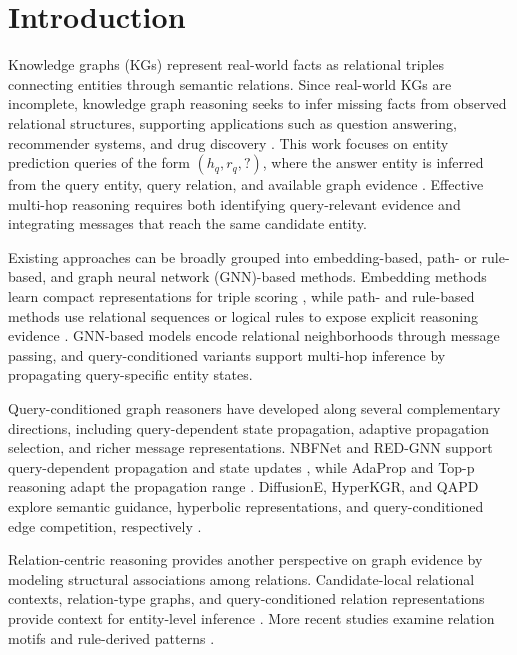\documentclass[a4paper,fleqn]{cas-dc}
\begin{document}
\maketitle

\section{Introduction}\label{sec:introduction}

Knowledge graphs (KGs) represent real-world facts as relational triples connecting entities through semantic relations. Since real-world KGs are incomplete, knowledge graph reasoning seeks to infer missing facts from observed relational structures, supporting applications such as question answering, recommender systems, and drug discovery \citep{Ji2022Survey,Cao2019KGRec,Zeng2022DrugDiscovery}. This work focuses on entity prediction queries of the form $(h_q,r_q,?)$, where the answer entity is inferred from the query entity, query relation, and available graph evidence \citep{QueryPerspectiveSurvey2025}. Effective multi-hop reasoning requires both identifying query-relevant evidence and integrating messages that reach the same candidate entity.

Existing approaches can be broadly grouped into embedding-based, path- or rule-based, and graph neural network (GNN)-based methods. Embedding methods learn compact representations for triple scoring \citep{Bordes2013TransE,Trouillon2016ComplEx,Sun2019RotatE}, while path- and rule-based methods use relational sequences or logical rules to expose explicit reasoning evidence \citep{Xiong2017DeepPath,Sadeghian2019DRUM}. GNN-based models encode relational neighborhoods through message passing, and query-conditioned variants support multi-hop inference by propagating query-specific entity states.

Query-conditioned graph reasoners have developed along several complementary directions, including query-dependent state propagation, adaptive propagation selection, and richer message representations. NBFNet and RED-GNN support query-dependent propagation and state updates \citep{Zhu2021NBFNet,Zhang2022REDGNN}, while AdaProp and Top-p reasoning adapt the propagation range \citep{Zhang2023AdaProp,Liu2025TopPReasoning}. DiffusionE, HyperKGR, and QAPD explore semantic guidance, hyperbolic representations, and query-conditioned edge competition, respectively \citep{Cao2024DiffusionE,HyperKGR2025,QAPD2026}.

Relation-centric reasoning provides another perspective on graph evidence by modeling structural associations among relations. Candidate-local relational contexts, relation-type graphs, and query-conditioned relation representations provide context for entity-level inference \citep{Geng2023RMPI,Lee2023InGram,Galkin2024ULTRA,Du2026GraphOracle}. More recent studies examine relation motifs and rule-derived patterns \citep{MOTIF2025,AdaRPT2025,MPRG2026}.
\end{document}
